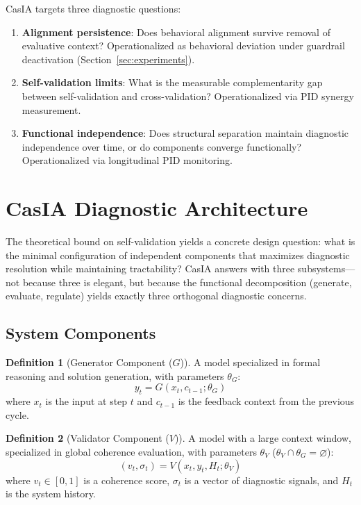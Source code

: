 \documentclass[11pt,a4paper]{article}
\theoremstyle{definition}
\newtheorem{definition}{Definition}[section]
\newcommand{\thetaG}{\theta_G}
\newcommand{\thetaV}{\theta_V}
\begin{document}
CasIA targets three diagnostic questions:
\begin{enumerate}[leftmargin=*,itemsep=3pt]
\item \textbf{Alignment persistence}: Does behavioral alignment survive removal of evaluative context? Operationalized as behavioral deviation under guardrail deactivation (Section~\ref{sec:experiments}).
\item \textbf{Self-validation limits}: What is the measurable complementarity gap between self-validation and cross-validation? Operationalized via PID synergy measurement.
\item \textbf{Functional independence}: Does structural separation maintain diagnostic independence over time, or do components converge functionally? Operationalized via longitudinal PID monitoring.
\end{enumerate}


\section{CasIA Diagnostic Architecture}
\label{sec:architecture}

The theoretical bound on self-validation yields a concrete design question: what is the minimal configuration of independent components that maximizes diagnostic resolution while maintaining tractability? CasIA answers with three subsystems---not because three is elegant, but because the functional decomposition (generate, evaluate, regulate) yields exactly three orthogonal diagnostic concerns.

\subsection{System Components}

\begin{definition}[Generator Component ($G$)]
A model specialized in formal reasoning and solution generation, with parameters $\thetaG$:
\begin{equation}
y_t = G(x_t, c_{t-1}; \thetaG)
\end{equation}
where $x_t$ is the input at step $t$ and $c_{t-1}$ is the feedback context from the previous cycle.
\end{definition}

\begin{definition}[Validator Component ($V$)]
A model with a large context window, specialized in global coherence evaluation, with parameters $\thetaV$ ($\thetaV \cap \thetaG = \varnothing$):
\begin{equation}
(v_t, \sigma_t) = V(x_t, y_t, H_t; \thetaV)
\end{equation}
where $v_t \in [0,1]$ is a coherence score, $\sigma_t$ is a vector of diagnostic signals, and $H_t$ is the system history.
\end{definition}
\end{document}
